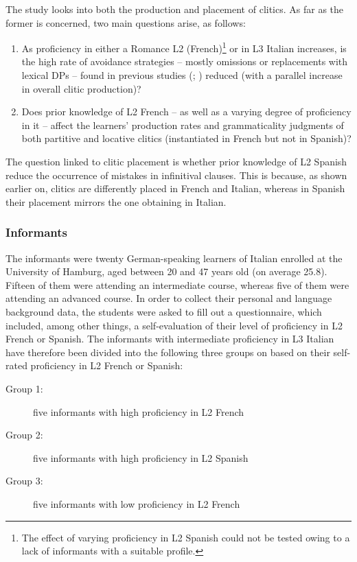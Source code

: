 \documentclass[output=paper,modfonts,nonflat,newtxmath]{langsci/langscibook}
\begin{document}
The study looks into both the production and placement of clitics. As far as the former is concerned, two main questions arise, as follows:

\begin{enumerate}
\item As proficiency in either a Romance L2 (French)\footnote{The effect of varying proficiency in L2 Spanish could not be tested owing to a lack of informants with a suitable profile.} or in L3 Italian increases, is the high rate of avoidance strategies – mostly omissions or replacements with lexical DPs – found in previous studies (\citealt[191]{ChiniEtAl2003}; \citealt{LeoniniBelletti2004, Leonini2006, Giannini2008, Maffei2009}) reduced (with a parallel increase in overall clitic production)?

\item Does prior knowledge of L2 French – as well as a varying degree of proficiency in it – affect the learners’ production rates and grammaticality judgments of both partitive and locative clitics (instantiated in French but not in Spanish)?
\end{enumerate}

The question linked to clitic placement is whether prior knowledge of L2 Spanish reduce the occurrence of mistakes in infinitival clauses. This is because, as shown earlier on, clitics are differently placed in French and Italian, whereas in Spanish their placement mirrors the one obtaining in Italian.

\subsubsection{Informants} %

The informants were twenty German-speaking learners of Italian enrolled at the University of Hamburg, aged between 20 and 47 years old (on average 25.8). Fifteen of them were attending an intermediate course, whereas five of them were attending an advanced course. In order to collect their personal and language background data, the students were asked to fill out a questionnaire, which included, among other things, a self-evaluation of their level of proficiency in L2 French or Spanish. The informants with intermediate proficiency in L3 Italian have therefore been divided into the following three groups on based on their self-rated proficiency in L2 French or Spanish:

\begin{description}
\item [Group 1:] five informants with high proficiency in L2 French
\item [Group 2:] five informants with high proficiency in L2 Spanish
\item [Group 3:] five informants with low proficiency in L2 French
\end{description}
\end{document}
